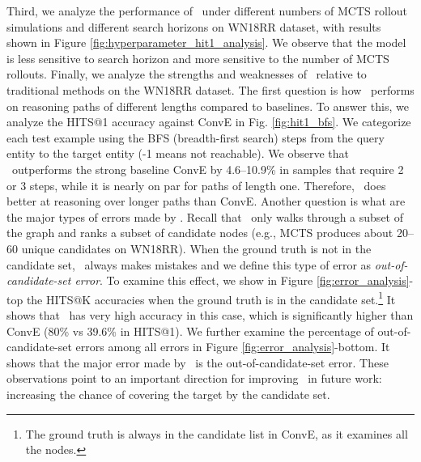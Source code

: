 \documentclass{article}
\begin{document}
	Third, we analyze the performance of \modelname~under different numbers of MCTS rollout simulations and different search horizons on WN18RR dataset, with results shown in Figure \ref{fig:hyperparameter_hit1_analysis}. We observe that the model is less sensitive to search horizon and more sensitive to the number of MCTS rollouts. 
	Finally, we analyze the strengths and weaknesses of \modelname~relative to traditional methods on the WN18RR dataset. The first question is how \modelname~performs on reasoning paths of different lengths compared to baselines. To answer this, we analyze the HITS@1 accuracy against ConvE in Fig. \ref{fig:hit1_bfs}. We categorize each test example using the BFS (breadth-first search) steps from the query entity to the target entity (-1 means not reachable). We observe that \modelname~outperforms the strong baseline ConvE by 4.6--10.9\% in samples that require 2 or 3 steps, while it is nearly on par for paths of length one. Therefore, \modelname~does better at reasoning over longer paths than ConvE. Another question is what are the major types of errors made by \modelname. Recall that \modelname~only walks through a subset of the graph and ranks a subset of candidate nodes (e.g., MCTS produces about 20--60 unique candidates on WN18RR). When the ground truth is not in the candidate set, \modelname~always makes mistakes and we define this type of error as \emph{out-of-candidate-set error}. To examine this effect, we show in Figure \ref{fig:error_analysis}-top the HITS@K accuracies when the ground truth is in the candidate set.\footnote{The ground truth is always in the candidate list in ConvE, as it examines all the nodes.} It shows that \modelname~has very high accuracy in this case, which is significantly higher than ConvE (80\% vs 39.6\% in HITS@1). We further examine the percentage of out-of-candidate-set errors among all errors in Figure \ref{fig:error_analysis}-bottom. It shows that the major error made by \modelname~is the out-of-candidate-set error. These observations point to an important direction for improving \modelname~in future work: increasing the chance of covering the target by the candidate set.
    
    
    
\end{document}
